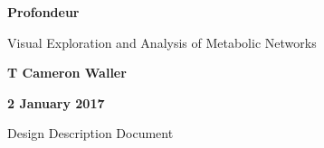 

\begin{titlepage}
\begin{center}

\vspace*{2cm}
\Huge
\textbf{Profondeur}

\vspace{0.5cm}
\LARGE
Visual Exploration and Analysis of Metabolic Networks

\vspace{1.5cm}
\LARGE
\textbf{T Cameron Waller}

\vspace{1.5cm}
\Large
\textbf{2 January 2017}


\vfill
\Large
Design Description Document

\end{center}
\end{titlepage}